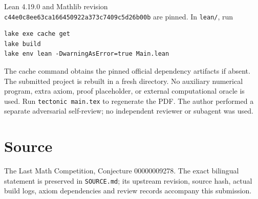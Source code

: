 \documentclass[11pt]{article}
\begin{document}
Lean 4.19.0 and Mathlib revision\\
\texttt{c44e0c8ee63ca166450922a373c7409c5d26b00b}
are pinned. In \texttt{lean/}, run
\begin{verbatim}
lake exe cache get
lake build
lake env lean -DwarningAsError=true Main.lean
\end{verbatim}
The cache command obtains the pinned official dependency artifacts
if absent. The submitted project is rebuilt in a fresh directory.
No auxiliary numerical program, extra axiom, proof placeholder, or
external computational oracle is used. Run \texttt{tectonic main.tex}
to regenerate the PDF. The author performed a separate adversarial
self-review; no independent reviewer or subagent was used.

\section*{Source}
The Last Math Competition, Conjecture 00000009278.
The exact bilingual statement is preserved in \texttt{SOURCE.md};
its upstream revision, source hash, actual build logs, axiom
dependencies and review records accompany this submission.
\end{document}
